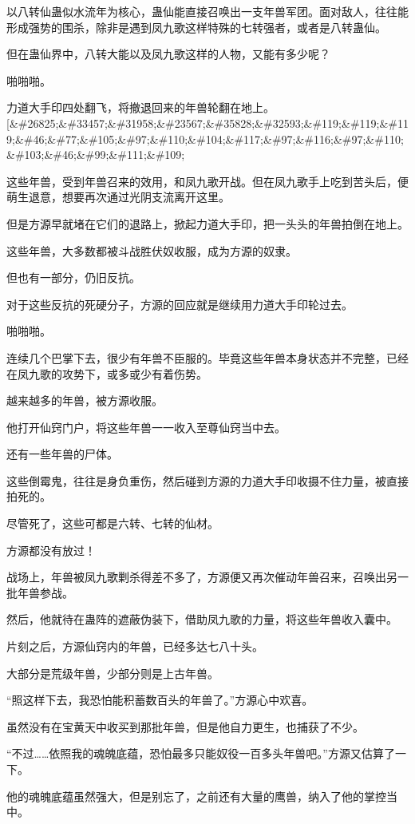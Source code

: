 \begin{this_body}
以八转仙蛊似水流年为核心，蛊仙能直接召唤出一支年兽军团。面对敌人，往往能形成强势的围杀，除非是遇到凤九歌这样特殊的七转强者，或者是八转蛊仙。

但在蛊仙界中，八转大能以及凤九歌这样的人物，又能有多少呢？

啪啪啪。

力道大手印四处翻飞，将撤退回来的年兽轮翻在地上。[\&\#26825;\&\#33457;\&\#31958;\&\#23567;\&\#35828;\&\#32593;\&\#119;\&\#119;\&\#119;\&\#46;\&\#77;\&\#105;\&\#97;\&\#110;\&\#104;\&\#117;\&\#97;\&\#116;\&\#97;\&\#110;\&\#103;\&\#46;\&\#99;\&\#111;\&\#109;

这些年兽，受到年兽召来的效用，和凤九歌开战。但在凤九歌手上吃到苦头后，便萌生退意，想要再次通过光阴支流离开这里。

但是方源早就堵在它们的退路上，掀起力道大手印，把一头头的年兽拍倒在地上。

这些年兽，大多数都被斗战胜伏奴收服，成为方源的奴隶。

但也有一部分，仍旧反抗。

对于这些反抗的死硬分子，方源的回应就是继续用力道大手印轮过去。

啪啪啪。

连续几个巴掌下去，很少有年兽不臣服的。毕竟这些年兽本身状态并不完整，已经在凤九歌的攻势下，或多或少有着伤势。

越来越多的年兽，被方源收服。

他打开仙窍门户，将这些年兽一一收入至尊仙窍当中去。

还有一些年兽的尸体。

这些倒霉鬼，往往是身负重伤，然后碰到方源的力道大手印收摄不住力量，被直接拍死的。

尽管死了，这些可都是六转、七转的仙材。

方源都没有放过！

战场上，年兽被凤九歌剿杀得差不多了，方源便又再次催动年兽召来，召唤出另一批年兽参战。

然后，他就待在蛊阵的遮蔽伪装下，借助凤九歌的力量，将这些年兽收入囊中。

片刻之后，方源仙窍内的年兽，已经多达七八十头。

大部分是荒级年兽，少部分则是上古年兽。

“照这样下去，我恐怕能积蓄数百头的年兽了。”方源心中欢喜。

虽然没有在宝黄天中收买到那批年兽，但是他自力更生，也捕获了不少。

“不过……依照我的魂魄底蕴，恐怕最多只能奴役一百多头年兽吧。”方源又估算了一下。

他的魂魄底蕴虽然强大，但是别忘了，之前还有大量的鹰兽，纳入了他的掌控当中。


\end{this_body}
